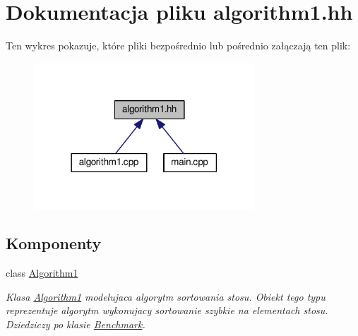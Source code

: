 \hypertarget{algorithm1_8hh}{\section{Dokumentacja pliku algorithm1.\-hh}
\label{algorithm1_8hh}
}
Ten wykres pokazuje, które pliki bezpośrednio lub pośrednio załączają ten plik\-:
\nopagebreak
\begin{figure}[H]
\begin{center}
\leavevmode
\includegraphics[width=234pt]{algorithm1_8hh__dep__incl}
\end{center}
\end{figure}
\subsection*{Komponenty}
\begin{DoxyCompactItemize}
\item 
class \hyperlink{class_algorithm1}{Algorithm1}
\begin{DoxyCompactList}\small\item\em Klasa \hyperlink{class_algorithm1}{Algorithm1} modelujaca algorytm sortowania stosu. Obiekt tego typu reprezentuje algorytm wykonujacy sortowanie szybkie na elementach stosu. Dziedziczy po klasie \hyperlink{class_benchmark}{Benchmark}. \end{DoxyCompactList}\end{DoxyCompactItemize}
